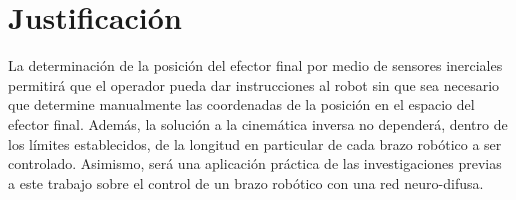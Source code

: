 \section{Justificación}

La determinación de la posición del efector final por medio de sensores inerciales permitirá que el operador pueda dar instrucciones al robot sin que sea necesario que determine manualmente las coordenadas de la posición en el espacio del efector final. Además, la solución a la cinemática inversa no dependerá, dentro de los límites establecidos, de la longitud en particular de cada brazo robótico a ser controlado. Asimismo, será una aplicación práctica de las investigaciones previas a este trabajo sobre el control de un brazo robótico con una red neuro-difusa.
